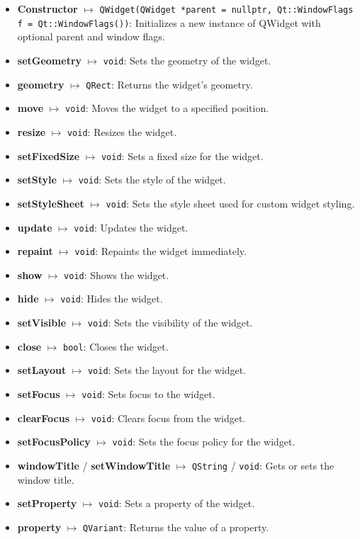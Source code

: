 \documentclass{report}
\begin{document}
    \pagebreak 
    \begin{itemize}
        \item \textbf{Constructor} $\mapsto$ \texttt{QWidget(QWidget *parent = nullptr, Qt::WindowFlags f = Qt::WindowFlags())}: Initializes a new instance of QWidget with optional parent and window flags.
        \item \textbf{setGeometry} $\mapsto$ \texttt{void}: Sets the geometry of the widget.
        \item \textbf{geometry} $\mapsto$ \texttt{QRect}: Returns the widget's geometry.
        \item \textbf{move} $\mapsto$ \texttt{void}: Moves the widget to a specified position.
        \item \textbf{resize} $\mapsto$ \texttt{void}: Resizes the widget.
        \item \textbf{setFixedSize} $\mapsto$ \texttt{void}: Sets a fixed size for the widget.
        \item \textbf{setStyle} $\mapsto$ \texttt{void}: Sets the style of the widget.
        \item \textbf{setStyleSheet} $\mapsto$ \texttt{void}: Sets the style sheet used for custom widget styling.
        \item \textbf{update} $\mapsto$ \texttt{void}: Updates the widget.
        \item \textbf{repaint} $\mapsto$ \texttt{void}: Repaints the widget immediately.
        \item \textbf{show} $\mapsto$ \texttt{void}: Shows the widget.
        \item \textbf{hide} $\mapsto$ \texttt{void}: Hides the widget.
        \item \textbf{setVisible} $\mapsto$ \texttt{void}: Sets the visibility of the widget.
        \item \textbf{close} $\mapsto$ \texttt{bool}: Closes the widget.
        \item \textbf{setLayout} $\mapsto$ \texttt{void}: Sets the layout for the widget.
        \item \textbf{setFocus} $\mapsto$ \texttt{void}: Sets focus to the widget.
        \item \textbf{clearFocus} $\mapsto$ \texttt{void}: Clears focus from the widget.
        \item \textbf{setFocusPolicy} $\mapsto$ \texttt{void}: Sets the focus policy for the widget.
        \item \textbf{windowTitle} / \textbf{setWindowTitle} $\mapsto$ \texttt{QString} / \texttt{void}: Gets or sets the window title.
        \item \textbf{setProperty} $\mapsto$ \texttt{void}: Sets a property of the widget.
        \item \textbf{property} $\mapsto$ \texttt{QVariant}: Returns the value of a property.
    \end{itemize}
\end{document}
